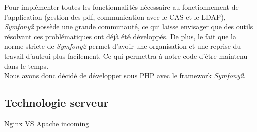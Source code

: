 Pour implémenter toutes les fonctionnalités nécessaire au fonctionnement de l'application (gestion des pdf, communication avec le CAS et le LDAP), \textit{Symfony2} possède une grande communauté, ce qui laisse envisager que des outils résolvant ces problématiques ont déjà été développés.
De plus, le fait que la norme stricte de \textit{Symfony2} permet d'avoir une organisation et une reprise du travail d'autrui plus facilement. Ce qui permettra à notre code d'être maintenu dans le temps.\\

Nous avons donc décidé de développer sous PHP avec le framework \textit{Symfony2}.

\subsection{Technologie serveur}

Nginx VS Apache incoming